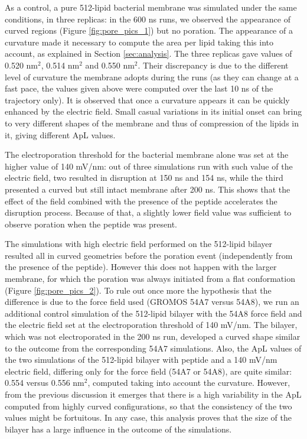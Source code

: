 As a control, a pure 512-lipid bacterial membrane was simulated under the same conditions, in three replicas: in the 600 ns runs, we observed the appearance of curved regions (Figure \ref{fig:pore_pics_1}) but no poration.
%
The appearance of a curvature made it necessary to compute the area per lipid taking this into account, as explained in Section \ref{sec:analysis}. The three replicas gave values of 0.520 nm$^2$, 0.514 nm$^2$ and 0.550 nm$^2$. Their discrepancy is due to the different level of curvature the membrane adopts during the runs (as they can change at a fast pace, the values given above were computed over the last 10 ns of the trajectory only).
%
It is observed that once a curvature appears it can be quickly enhanced by the electric field. Small casual variations in its initial onset can bring to very different shapes of the membrane and thus of compression of the lipids in it, giving different ApL values.

The electroporation threshold for the bacterial membrane alone was set at the higher value of 140 mV/nm: out of three simulations run with such value of the electric field, two resulted in disruption at 150 ns and 154 ns, while the third presented a curved but still intact membrane after 200 ns.
%
This shows that the effect of the field combined with the presence of the peptide accelerates the disruption process. Because of that, a slightly lower field value was sufficient to observe poration when the peptide was present.

The simulations with high electric field performed on the 512-lipid bilayer resulted all in curved geometries before the poration event (independently from the presence of the peptide). However this does not happen with the larger membrane, for which the poration was always initiated from a flat conformation (Figure \ref{fig:pore_pics_2}).
%
To rule out once more the hypothesis that the difference is due to the force field used (GROMOS 54A7 versus 54A8), we run an additional control simulation of the 512-lipid bilayer with the 54A8 force field and the electric field set at the electroporation threshold of 140 mV/nm. The bilayer, which was not electroporated in the 200 ns run, developed a curved shape similar to the outcome from the corresponding 54A7 simulations.
%
Also, the ApL values of the two simulations of the 512-lipid bilayer with peptide and a 140 mV/nm electric field, differing only for the force field (54A7 or 54A8), are quite similar: 0.554 versus 0.556 nm$^2$, computed taking into account the curvature.
%
However, from the previous discussion it emerges that there is a high variability in the ApL computed from highly curved configurations, so that the consistency of the two values might be fortuitous.
%
In any case, this analysis proves that the size of the bilayer has a large influence in the outcome of the simulations.

